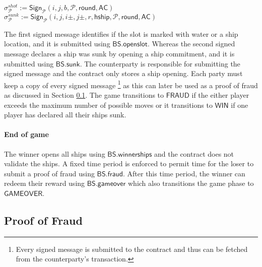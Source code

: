 \documentclass{llncs}
\newcommand{\instantiatedno}{\mathsf{NO}}
\newcommand{\instantiatedyes}{\mathsf{YES}}
\newcommand{\gamewinner}{\mathsf{WIN}}
\newcommand{\gamefraud}{\mathsf{FRAUD}}
\newcommand{\gamefinished}{\mathsf{GAMEOVER}}
\newcommand{\hship}{\mathsf{hship}}
\newcommand{\hshiplocation}{\mathsf{hshiplocation}}
\newcommand{\participant}{\mathcal{P}}
\newcommand{\sign}{\mathsf{Sign}}
\newcommand{\battleshipfraud}{\mathsf{BS.fraud}}
\newcommand{\battleshiprevealslot}{\mathsf{BS.openslot}}
\newcommand{\battleshipsinking}{\mathsf{BS.sunk}}
\newcommand{\battleshiprevealships}{\mathsf{BS.winnerships}}
\newcommand{\battleshipgameover}{\mathsf{BS.gameover}}
\newcommand{\appcontract}{\mathsf{AC}}
\begin{document}
\begin{center}
	$\sigma^{shot}_{\participant} := \sign_{\participant}(i,j,b,\participant,\mathsf{round},\appcontract)$ \\ $\sigma^{sunk}_{\participant} := \sign_{\participant}(i,j,i\pm,j\pm,r,\hship,\participant,\mathsf{round},\appcontract)$
\end{center}

The first signed message identifies if the slot is marked with water or a ship location, and it is submitted using $\battleshiprevealslot$.
Whereas the second signed message declares a ship was sunk by opening a ship commitment, and it is submitted using $\battleshipsinking$. 
The counterparty is responsible for submitting the signed message and the contract only stores a ship opening. 
Each party must keep a copy of every signed message \footnote{Every signed message is submitted to the contract and thus can be fetched from the counterparty's transaction.} as this can later be used as a proof of fraud as discussed in Section \ref{sec:fraud}.
The game transitions to $\gamefraud$ if the either player exceeds the maximum number of possible moves or it transitions to $\gamewinner$ if one player has declared all their ships sunk. 

\paragraph{End of game} 

The winner opens all ships using $\battleshiprevealships$ and the contract does not validate the ships. 
A fixed time period is enforced to permit time for the loser to submit a proof of fraud using $\battleshipfraud$.
After this time period, the winner can redeem their reward using $\battleshipgameover$ which also transitions the game phase to $\gamefinished$. 


\subsection{Proof of Fraud} \label{sec:fraud}
\end{document}
